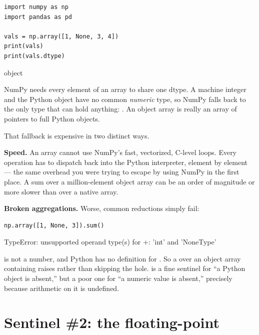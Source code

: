 \documentclass[11pt]{article}
\begin{document}
\begin{lstlisting}
import numpy as np
import pandas as pd

vals = np.array([1, None, 3, 4])
print(vals)
print(vals.dtype)
\end{lstlisting}

\begin{outblock}
[1 None 3 4]
object
\end{outblock}

\begin{keyidea}
NumPy needs every element of an array to share one dtype. A machine integer and the Python object  have no common \emph{numeric} type, so NumPy falls back to the only type that can hold anything: . An object array is really an array of pointers to full Python objects.
\end{keyidea}

That fallback is expensive in two distinct ways.

\textbf{Speed.} An  array cannot use NumPy's fast, vectorized, C-level loops. Every operation has to dispatch back into the Python interpreter, element by element --- the same overhead you were trying to escape by using NumPy in the first place. A sum over a million-element object array can be an order of magnitude or more slower than over a native  array.

\textbf{Broken aggregations.} Worse, common reductions simply fail:

\begin{lstlisting}
np.array([1, None, 3]).sum()
\end{lstlisting}

\begin{outblock}
TypeError: unsupported operand type(s) for +: 'int' and 'NoneType'
\end{outblock}

\begin{pitfall}
 is not a number, and Python has no definition for . So a  over an object array containing  raises  rather than skipping the hole.  is a fine sentinel for ``a Python object is absent,'' but a poor one for ``a numeric value is absent,'' precisely because arithmetic on it is undefined.
\end{pitfall}

\section{Sentinel \#2: the floating-point }
\end{document}
